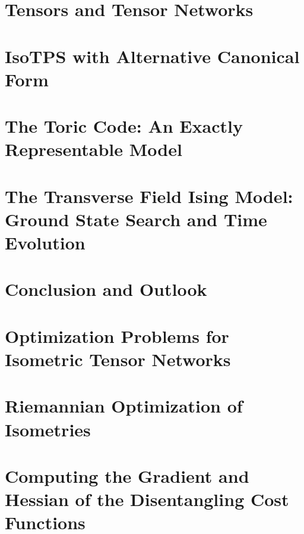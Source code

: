 \documentclass[encoding=utf8,british]{template/thesis}
\begin{document}
\begin{refsection}
	\chapter{Tensors and Tensor Networks}
	\label{chap:tensors_and_tensor_networks}
	
	
	\chapter{IsoTPS with Alternative Canonical Form}
	\label{chap:isoTPS_alternative_canonical_form}
	
	
	\chapter{The Toric Code: An Exactly Representable Model}
	\label{chap:toric_code}
	
	
	\chapter{The Transverse Field Ising Model: Ground State Search and Time Evolution}
	\label{chap:TFI}
	
	
	\chapter{Conclusion and Outlook}
	\label{chap:summary}
	
	
	\appendix
	
	\chapter{Optimization Problems for Isometric Tensor Networks}
	\label{app:optimization_problems_for_isometric_tensor_networks}
	
	
	\chapter{Riemannian Optimization of Isometries}
	\label{app:riemannian_optimization_of_isometries}
	
	
	\chapter{Computing the Gradient and Hessian of the Disentangling Cost Functions}
	\label{app:computation_of_gradient_and_hvp_for_riemannian_optimization}
		
	
	\backmatter
	\printbibliography
	\end{refsection}
	\begin{refsection}
	\nocite{Website:ColorBrewer}
	\nocite{Website:ColorBlind}
	\printbibliography[heading=subbibliography, title={Resources for Plotting}]
	\end{refsection}
	
\end{document}
